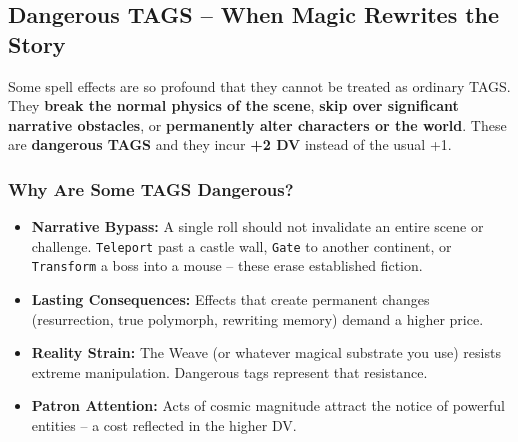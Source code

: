 
\subsection*{Dangerous TAGS -- When Magic Rewrites the Story}
\label{subsec:dangerous-tags}

Some spell effects are so profound that they cannot be treated as ordinary TAGS. They \textbf{break the normal physics of the scene}, \textbf{skip over significant narrative obstacles}, or \textbf{permanently alter characters or the world}. These are \textbf{dangerous TAGS} and they incur \textbf{+2 DV} instead of the usual +1.

\subsubsection*{Why Are Some TAGS Dangerous?}
\begin{itemize}
  \item \textbf{Narrative Bypass:} A single roll should not invalidate an entire scene or challenge. \texttt{Teleport} past a castle wall, \texttt{Gate} to another continent, or \texttt{Transform} a boss into a mouse -- these erase established fiction.
  \item \textbf{Lasting Consequences:} Effects that create permanent changes (resurrection, true polymorph, rewriting memory) demand a higher price.
  \item \textbf{Reality Strain:} The Weave (or whatever magical substrate you use) resists extreme manipulation. Dangerous tags represent that resistance.
  \item \textbf{Patron Attention:} Acts of cosmic magnitude attract the notice of powerful entities -- a cost reflected in the higher DV.
\end{itemize}

